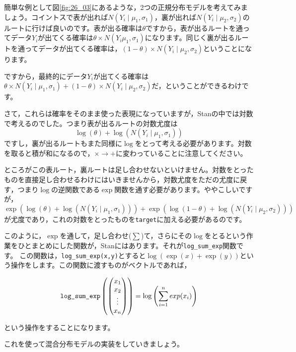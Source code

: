 \documentclass{ltjsbook}
\begin{document}
簡単な例として図\ref{fig:26_03}にあるような，2つの正規分布モデルを考えてみましょう。コイントスで表が出れば$N(Y_i \mid \mu_1,\sigma_1)$，裏が出れば$N(Y_i \mid \mu_2,\sigma_2)$のルートに行けば良いのです。表が出る確率は$\theta$ですから，表が出るルートを通ってデータ$Y_i$が出てくる確率は$\theta \times N(Y_i\mu_1,\sigma_1)$になります。同じく裏が出るルートを通ってデータが出てくる確率は，$(1-\theta) \times N(Y_i \mid \mu_2,\sigma_2)$ということになります。

ですから，最終的にデータ$Y_i$が出てくる確率は$\theta \times N(Y_i \mid \mu_1,\sigma_1) + (1-\theta) \times N(Y_i\mid\mu_2,\sigma_2)$だ，ということができるわけです。

さて，これらは確率をそのまま使った表現になっていますが，Stanの中では対数で考えるのでした。つまり表が出るルートの対数尤度は
\[ \log(\theta) + \log(N(Y_i\mid\mu_1,\sigma_1)) \]
ですし，裏が出るルートもまた同様に$\log$をとって考える必要があります。対数を取ると積が和になるので，$\times \to +$に変わっていることに注意してください。

ところがこの表ルート，裏ルートは足し合わせないといけません。対数をとったものを直接足し合わせるわけにはいきませんから，対数尤度をただの尤度に戻す，つまり$\log$の逆関数である$\exp$関数を通す必要があります。ややこしいですが，
\[ \exp\left( \log(\theta) + \log(N(Y_i\mid\mu_1,\sigma_1)) \right) + \exp\left( \log(1-\theta) + \log(N(Y_i\mid\mu_2,\sigma_2)) \right) \]
が尤度であり，これの対数をとったものを\verb|target|に加える必要があるのです。

このように，$\exp$を通して，足し合わせ($\sum$)て，さらにその$\log$をとるという作業をひとまとめにした関数が，Stanにはあります。それが\verb|log_sum_exp|関数です。
この関数は，\verb|log_sum_exp(x,y)|とすると$\log(\exp(x)+\exp(y))$という操作をします。この関数に渡すものがベクトルであれば，

\[ \verb|log_sum_exp|\left( \begin{pmatrix} x_1\\x_2\\ \vdots \\ x_n \end{pmatrix} \right) = \log\left(\sum_{i=1}^n exp(x_i) \right) \]

という操作をすることになります。

これを使って混合分布モデルの実装をしていきましょう。
\end{document}
